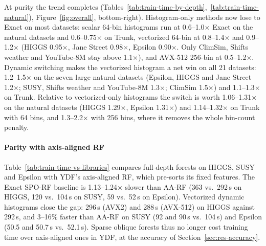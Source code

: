 \documentclass[sigconf,anonymous,review]{acmart}
\begin{document}
At purity the trend completes (Tables~\ref{tab:train-time-by-depth},~\ref{tab:train-time-natural}), Figure~\ref{fig:overall}, bottom-right). Histogram-only methods now lose to Exact on most datasets: scalar 64-bin histograms run at 0.6--1.0$\times$ Exact on the natural datasets and 0.6--0.75$\times$ on Trunk, vectorized 64-bin at 0.8--1.4$\times$ and 0.9--1.2$\times$ (HIGGS 0.95$\times$, Jane Street 0.98$\times$, Epsilon 0.90$\times$. Only ClimSim, Shifts weather and YouTube-8M stay above 1.1$\times$), and AVX-512 256-bin at 0.5--1.2$\times$. Dynamic switching makes the vectorized histogram a net win on all 21 datasets: 1.2--1.5$\times$ on the seven large natural datasets (Epsilon, HIGGS and Jane Street 1.2$\times$; SUSY, Shifts weather and YouTube-8M 1.3$\times$; ClimSim 1.5$\times$) and 1.1--1.3$\times$ on Trunk. Relative to vectorized-only histograms the switch is worth 1.06--1.31$\times$ on the natural datasets (HIGGS 1.29$\times$, Epsilon 1.31$\times$) and 1.14--1.32$\times$ on Trunk with 64 bins, and 1.3--2.2$\times$ with 256 bins, where it removes the whole bin-count penalty.

\paragraph{Parity with axis-aligned RF} Table~\ref{tab:train-time-vs-libraries} compares full-depth forests on HIGGS, SUSY and Epsilon with YDF's axis-aligned RF, which pre-sorts its fixed features. The Exact SPO-RF baseline is 1.13--1.24$\times$ slower than AA-RF (363 vs.\ 292\,s on HIGGS, 120 vs.\ 104\,s on SUSY, 59 vs.\ 52\,s on Epsilon). Vectorized dynamic histograms close the gap: 296\,s (AVX2) and 288\,s (AVX-512) on HIGGS against 292\,s, and 3--16\% faster than AA-RF on SUSY (92 and 90\,s vs.\ 104\,s) and Epsilon (50.5 and 50.7\,s vs.\ 52.1\,s). Sparse oblique forests thus no longer cost training time over axis-aligned ones in YDF, at the accuracy of Section~\ref{sec:res-accuracy}.


\end{document}
